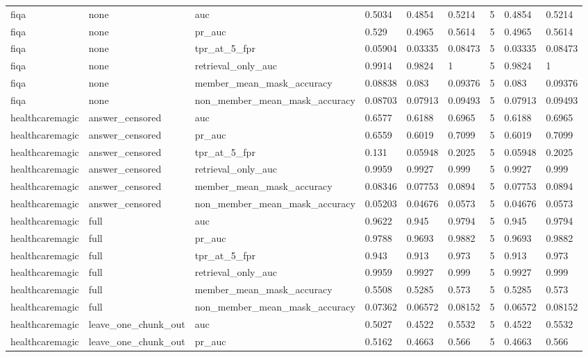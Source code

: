 \begin{tabular}{lllllllll}
fiqa & none & auc & 0.5034 & 0.4854 & 0.5214 & 5 & 0.4854 & 0.5214 \\
fiqa & none & pr\_auc & 0.529 & 0.4965 & 0.5614 & 5 & 0.4965 & 0.5614 \\
fiqa & none & tpr\_at\_5\_fpr & 0.05904 & 0.03335 & 0.08473 & 5 & 0.03335 & 0.08473 \\
fiqa & none & retrieval\_only\_auc & 0.9914 & 0.9824 & 1 & 5 & 0.9824 & 1 \\
fiqa & none & member\_mean\_mask\_accuracy & 0.08838 & 0.083 & 0.09376 & 5 & 0.083 & 0.09376 \\
fiqa & none & non\_member\_mean\_mask\_accuracy & 0.08703 & 0.07913 & 0.09493 & 5 & 0.07913 & 0.09493 \\
healthcaremagic & answer\_censored & auc & 0.6577 & 0.6188 & 0.6965 & 5 & 0.6188 & 0.6965 \\
healthcaremagic & answer\_censored & pr\_auc & 0.6559 & 0.6019 & 0.7099 & 5 & 0.6019 & 0.7099 \\
healthcaremagic & answer\_censored & tpr\_at\_5\_fpr & 0.131 & 0.05948 & 0.2025 & 5 & 0.05948 & 0.2025 \\
healthcaremagic & answer\_censored & retrieval\_only\_auc & 0.9959 & 0.9927 & 0.999 & 5 & 0.9927 & 0.999 \\
healthcaremagic & answer\_censored & member\_mean\_mask\_accuracy & 0.08346 & 0.07753 & 0.0894 & 5 & 0.07753 & 0.0894 \\
healthcaremagic & answer\_censored & non\_member\_mean\_mask\_accuracy & 0.05203 & 0.04676 & 0.0573 & 5 & 0.04676 & 0.0573 \\
healthcaremagic & full & auc & 0.9622 & 0.945 & 0.9794 & 5 & 0.945 & 0.9794 \\
healthcaremagic & full & pr\_auc & 0.9788 & 0.9693 & 0.9882 & 5 & 0.9693 & 0.9882 \\
healthcaremagic & full & tpr\_at\_5\_fpr & 0.943 & 0.913 & 0.973 & 5 & 0.913 & 0.973 \\
healthcaremagic & full & retrieval\_only\_auc & 0.9959 & 0.9927 & 0.999 & 5 & 0.9927 & 0.999 \\
healthcaremagic & full & member\_mean\_mask\_accuracy & 0.5508 & 0.5285 & 0.573 & 5 & 0.5285 & 0.573 \\
healthcaremagic & full & non\_member\_mean\_mask\_accuracy & 0.07362 & 0.06572 & 0.08152 & 5 & 0.06572 & 0.08152 \\
healthcaremagic & leave\_one\_chunk\_out & auc & 0.5027 & 0.4522 & 0.5532 & 5 & 0.4522 & 0.5532 \\
healthcaremagic & leave\_one\_chunk\_out & pr\_auc & 0.5162 & 0.4663 & 0.566 & 5 & 0.4663 & 0.566 \\

\end{tabular}

